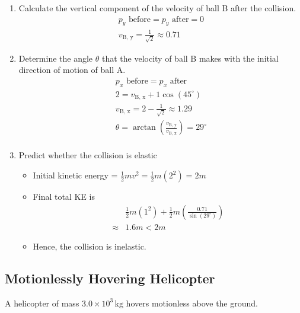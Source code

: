 \documentclass[a4paper,12pt]{article}
\newcommand{\degsym}{^{\circ}}
\begin{document}
\begin{enumerate}[label=(\alph*)]
  \item Calculate the vertical component of the velocity of ball B after the collision.
        \begin{align*}
          p_y \text{ before} = p_y \text{ after} = 0 \\
          v_\text{B, y} = \frac{1}{\sqrt{2}} \approx 0.71
        \end{align*}
  \item Determine the angle $\theta$ that the velocity of ball B makes with the initial direction of motion of ball A.
        \begin{align*}
          p_x \text{ before} = p_x \text{ after}                                       \\
          2 = v_\text{B, x} + 1\cos(45\degsym)                                         \\
          v_\text{B, x} = 2 - \frac{1}{\sqrt{2}} \approx 1.29                          \\
          \theta = \arctan\left(\frac{v_\text{B, y}}{v_\text{B, x}}\right) = 29\degsym \\
        \end{align*}
  \item Predict whether the collision is elastic
        \begin{itemize}
          \item Initial kinetic energy = $\frac{1}{2}mv^2 = \frac{1}{2}m(2^2) = 2m$
          \item Final total KE is
                \begin{align*}
                          & \frac{1}{2}m(1^2) + \frac{1}{2}m\left(\frac{0.71}{\sin(29\degsym)}\right) \\
                  \approx & 1.6m < 2m
                \end{align*}
          \item Hence, the collision is inelastic.
        \end{itemize}
\end{enumerate}

\subsection{Motionlessly Hovering Helicopter}

A helicopter of mass \( 3.0 \times 10^3 \, \text{kg} \) hovers motionless above the ground.
\end{document}
